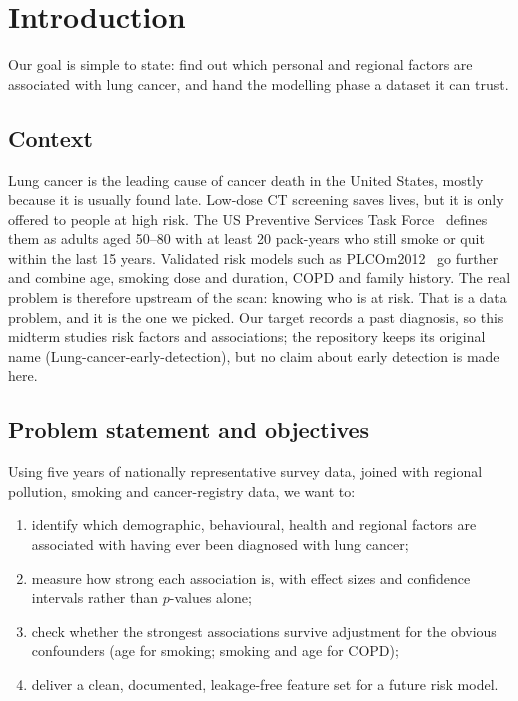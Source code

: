 \section{Introduction}\label{sec:intro}

Our goal is simple to state: find out which personal and regional factors are associated with lung cancer, and hand the modelling phase a dataset it can trust.

\subsection{Context}\label{sec:context}

Lung cancer is the leading cause of cancer death in the United States, mostly because it is usually found late. Low-dose CT screening saves lives, but it is only offered to people at high risk. The US Preventive Services Task Force~\cite{uspstf} defines them as adults aged 50--80 with at least 20 pack-years who still smoke or quit within the last 15 years. Validated risk models such as PLCOm2012~\cite{tammemagi} go further and combine age, smoking dose and duration, COPD and family history. The real problem is therefore upstream of the scan: knowing who is at risk. That is a data problem, and it is the one we picked. Our target records a past diagnosis, so this midterm studies risk factors and associations; the repository keeps its original name (Lung-cancer-early-detection), but no claim about early detection is made here.

\subsection{Problem statement and objectives}\label{sec:problem}

Using five years of nationally representative survey data, joined with regional pollution, smoking and cancer-registry data, we want to:
\begin{enumerate}
  \item identify which demographic, behavioural, health and regional factors are associated with having ever been diagnosed with lung cancer;
  \item measure how strong each association is, with effect sizes and confidence intervals rather than $p$-values alone;
  \item check whether the strongest associations survive adjustment for the obvious confounders (age for smoking; smoking and age for COPD);
  \item deliver a clean, documented, leakage-free feature set for a future risk model.
\end{enumerate}

